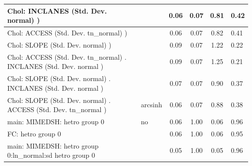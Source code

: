 \begin{table}
\begin{center}
\begin{tabular}{|l|l|c|c|c|l|}
			\hline
			 Chol: INCLANES (Std. Dev. normal) ) &  & 0.06 & 0.07 & 0.81 & 0.42 \\
			\hline
			 Chol: ACCESS (Std. Dev. tn_normal) ) &  & 0.06 & 0.07 & 0.82 & 0.41 \\
			\hline
			 Chol: SLOPE (Std. Dev. normal) ) &  & 0.09 & 0.07 & 1.22 & 0.22 \\
			\hline
			 Chol: ACCESS (Std. Dev. tn_normal) . INCLANES (Std. Dev.   normal ) &  & 0.09 & 0.07 & 1.25 & 0.21 \\
			\hline
			 Chol: SLOPE (Std. Dev. normal) . INCLANES (Std. Dev.   normal ) &  & 0.07 & 0.07 & 0.90 & 0.37 \\
			\hline
			 Chol: SLOPE (Std. Dev. normal) . ACCESS (Std. Dev.   tn_normal ) & arcsinh & 0.06 & 0.07 & 0.88 & 0.38 \\
			\hline
			main: MIMEDSH: hetro group 0 & no & 0.06 & 1.00 & 0.06 & 0.96 \\
			\hline
			FC: hetro group 0 &  & 0.06 & 1.00 & 0.06 & 0.95 \\
			\hline
			main: MIMEDSH: hetro group 0:ln_normal:sd  hetro group 0 &  & 0.05 & 1.00 & 0.05 & 0.96 \\
			\hline
		\end{tabular}
	\end{center}
\end{table}